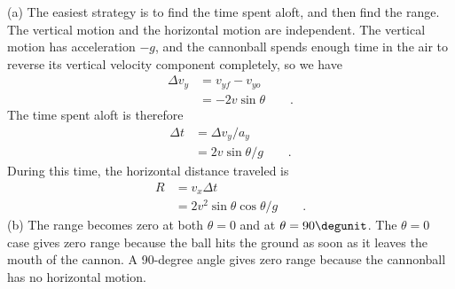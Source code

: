 (a) The easiest strategy is to find the time spent aloft,
and then find the range. The vertical motion and the
horizontal motion are independent. The vertical motion has
acceleration $-g$, and the cannonball spends enough time in
the air to reverse its vertical velocity component
completely, so we have
\begin{align*}
        \Delta v_y     &=  v_{yf}-v_{yo}  \\
             &=  -2v \sin  \theta    \qquad   .
\end{align*}
The time spent aloft is therefore
\begin{align*}
        \Delta t     &=  \Delta v_y/ a_y  \\
             &=  2v \sin  \theta  / g   \qquad   .
\end{align*}
During this time, the horizontal distance traveled is
\begin{align*}
        R     &=  v_x\Delta t  \\
             &=  2 v ^2 \sin  \theta \cos  \theta  / g   \qquad   .
\end{align*}
(b) The range becomes zero at both $\theta=0$ and at
$\theta=90\degunit$. The $\theta=0$ case gives zero range
because the ball hits the ground as soon as it leaves the
mouth of the cannon. A 90-degree angle gives zero range
because the cannonball has no horizontal motion.
